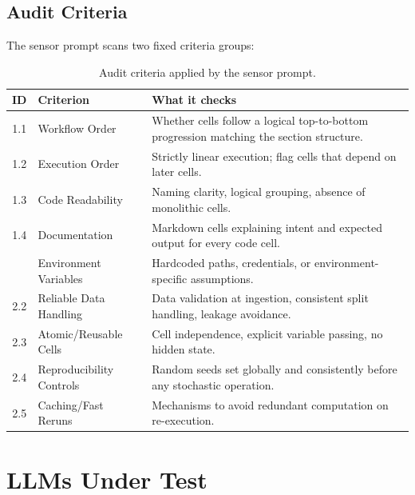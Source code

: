 \documentclass[11pt, a4paper]{article}
\begin{document}
\subsection{Audit Criteria}

The sensor prompt scans two fixed criteria groups:

\begin{table}[ht]
  \centering
  \caption{Audit criteria applied by the sensor prompt.}
  \renewcommand{\arraystretch}{1.2}
  \begin{tabular}{c l p{}}
    \toprule
    \textbf{ID} & \textbf{Criterion} & \textbf{What it checks} \\
    \midrule
    1.1 & Workflow Order & Whether cells follow a logical top-to-bottom
         progression matching the section structure. \\
    1.2 & Execution Order & Strictly linear execution; flag cells that depend
         on later cells. \\
    1.3 & Code Readability & Naming clarity, logical grouping, absence of
         monolithic cells. \\
    1.4 & Documentation & Markdown cells explaining intent and expected output
         for every code cell. \\
    \addlinespace
    2.1 & Environment Variables & Hardcoded paths, credentials, or
         environment-specific assumptions. \\
    2.2 & Reliable Data Handling & Data validation at ingestion, consistent
         split handling, leakage avoidance. \\
    2.3 & Atomic/Reusable Cells & Cell independence, explicit variable passing,
         no hidden state. \\
    2.4 & Reproducibility Controls & Random seeds set globally and consistently
         before any stochastic operation. \\
    2.5 & Caching/Fast Reruns & Mechanisms to avoid redundant computation on
         re-execution. \\
    \bottomrule
  \end{tabular}
  \label{tab:criteria}
\end{table}

\section{LLMs Under Test}
\end{document}

